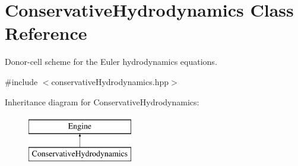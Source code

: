 \hypertarget{classConservativeHydrodynamics}{}\section{Conservative\+Hydrodynamics Class Reference}
\label{classConservativeHydrodynamics}


Donor-\/cell scheme for the Euler hydrodynamics equations.  




{\ttfamily \#include $<$conservative\+Hydrodynamics.\+hpp$>$}

Inheritance diagram for Conservative\+Hydrodynamics\+:\begin{figure}[H]
\begin{center}
\leavevmode
\includegraphics[height=2.000000cm]{classConservativeHydrodynamics}
\end{center}
\end{figure}
